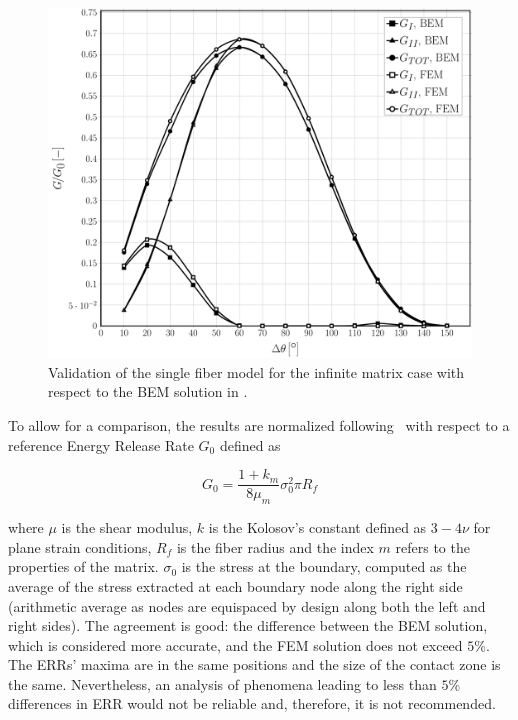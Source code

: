 \documentclass[review]{elsarticle}
\begin{document}
\begin{figure}[!h]
\centering
\includegraphics[width=\textwidth]{validation-VCCT.pdf}
\caption{Validation of the single fiber model for the infinite matrix case with respect to the BEM solution in \cite{Sandino2016}.}\label{fig:validation}
\end{figure}

To allow for a comparison, the results are normalized following~\cite{Sandino2016} with respect to a reference Energy Release Rate $G_{0}$ defined as

\begin{equation}
G_{0}=\frac{1+k_{m}}{8\mu_{m}}\sigma_{0}^{2}\pi R_{f}
\end{equation}

where $\mu$ is the shear modulus, $k$ is the Kolosov's constant defined as $3-4\nu$ for plane strain conditions, $R_{f}$ is the fiber radius and the index $m$ refers to the properties of the matrix. $\sigma_{0}$ is the stress at the boundary, computed as the average of the stress extracted at each boundary node along the right side (arithmetic average as nodes are equispaced by design along both the left and right sides). The agreement is good: the difference between the BEM solution, which is considered more accurate, and the FEM solution does not exceed $5\%$. The ERRs' maxima are in the same positions and the size of the contact zone is the same.  Nevertheless, an analysis of phenomena leading to less than $5\%$ differences in ERR would not be reliable and, therefore, it is not recommended.
\end{document}
